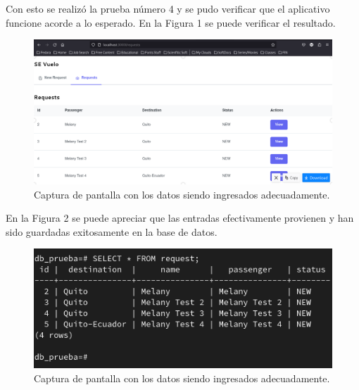 \documentclass{article}
\begin{document}
	Con esto se realizó la prueba número 4 y se pudo verificar que el 
	aplicativo funcione acorde a lo esperado. En la Figura 1 se puede 
	verificar el resultado.
	
	\begin{figure}[!h]
		\centering
		\includegraphics[scale=0.33]{browser.png}
		\caption{Captura de pantalla con los datos siendo ingresados 
		adecuadamente.}
	\end{figure}
	
	En la Figura 2 se puede apreciar que las entradas efectivamente 
	provienen y han sido guardadas exitosamente en la base de datos.
	
	\begin{figure}[!h]
		\centering
		\includegraphics[scale=0.40]{terminal.png}
		\caption{Captura de pantalla con los datos siendo ingresados 
		adecuadamente.}
	\end{figure}
\end{document}
